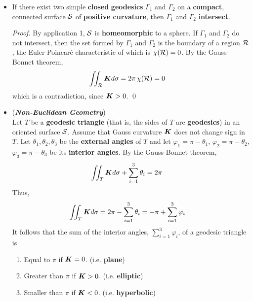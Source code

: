 \documentclass[11pt]{article}
\begin{document}
\begin{itemize}
\item \begin{proposition}
If there exist two simple \textbf{closed} \textbf{geodesics} $\Gamma_1$ and $\Gamma_2$ on a \textbf{compact}, connected surface ${\mathcal S}$ of \textbf{positive curvature}, then $\Gamma_1$ and $\Gamma_2$  \textbf{intersect}.
\end{proposition}
\begin{proof}
By application 1, ${\mathcal S}$ is \textbf{homeomorphic} to a sphere. If  $\Gamma_1$ and $\Gamma_2$ do not intersect, then the set formed by  $\Gamma_1$ and $\Gamma_2$ is the boundary of a region ${\mathcal R}$, the Euler-Poincar\'e characteristic of which is $\chi({\mathcal R}) = 0$. By the Gauss-Bonnet theorem,
\begin{align*}
\iint_{{\mathcal R}}\boldsymbol{K}d\sigma &= 2\pi\,\chi({\mathcal R}) = 0
\end{align*} which is a contradiction, since $\boldsymbol{K} > 0$. \qed
\end{proof}

\item \begin{remark} (\textbf{\emph{Non-Euclidean Geometry}})\\
Let $T$ be a \textbf{geodesic triangle} (that is, the sides of $T$ are \textbf{geodesics}) in an oriented surface ${\mathcal S}$. Assume that Gauss curvature $\boldsymbol{K}$ does not change sign in $T$. Let $\theta_1, \theta_2, \theta_3$ be the \textbf{external angles} of $T$ and let $\varphi_1 = \pi - \theta_1$,  $\varphi_2 = \pi - \theta_2$,  $\varphi_3 = \pi - \theta_3$ be its \textbf{interior angles}. By the Gauss-Bonnet theorem,
\begin{align*}
\iint_{T}\boldsymbol{K}d\sigma + \sum_{i=1}^{3}\theta_i &= 2\pi\,
\end{align*}
Thus,
\begin{align}
\iint_{T}\boldsymbol{K}d\sigma &= 2\pi- \sum_{i=1}^{3}\theta_i = -\pi + \sum_{i=1}^{3}\varphi_{i} \label{eqn: non_euclidean_sum_interior_angles}
\end{align}
It follows that the sum of the interior angles, $\sum_{i=1}^{3}\varphi_{i}$, of a geodesic triangle is
\begin{enumerate}
\item Equal to $\pi$ if $\boldsymbol{K} = 0$. (i.e. \textbf{plane})
\item Greater than $\pi$ if $\boldsymbol{K} > 0$. (i.e. \textbf{elliptic}) 
\item Smaller than $\pi$ if $\boldsymbol{K} < 0$. (i.e. \textbf{hyperbolic}) 
\end{enumerate}


\end{remark}
\end{itemize}
\end{document}
